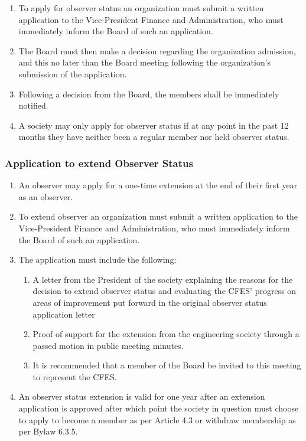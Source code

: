 \begin{enumerate}
 \item
  To apply for observer status an organization must submit a written application to the Vice-President Finance and Administration, who must immediately inform the Board of such an application.
 \item
  The Board must then make a decision regarding the organization admission, and this no later than the Board meeting following the organization's submission of the application.
 \item
  Following a decision from the Board, the members shall be immediately notified.
 \item
  A society may only apply for observer status if at any point in the past 12 months they have neither been a regular member nor held observer status.
\end{enumerate}

\subsubsection{Application to extend Observer Status}
\label{application-to-extend-observer-status}

\begin{enumerate}
 \item
  An observer may apply for a one-time extension at the end of their first year as an observer.
 \item
  To extend observer an organization must submit a written application to the Vice-President Finance and Administration, who must immediately inform the Board of such an application.
 \item
  The application must include the following:
  \begin{enumerate}
   \item
    A letter from the President of the society explaining the reasons for the decision to extend observer status and evaluating the CFES' progress on areas of improvement put forward in the original observer status application letter
   \item
    Proof of support for the extension from the engineering society through a passed motion in public meeting minutes.
   \item
    It is recommended that a member of the Board be invited to this meeting to represent the CFES.
  \end{enumerate}

 \item
  An observer status extension is valid for one year after an extension application is approved after which point the society in question must choose to apply to become a member as per Article 4.3 or withdraw membership as per Bylaw 6.3.5.

\end{enumerate}

